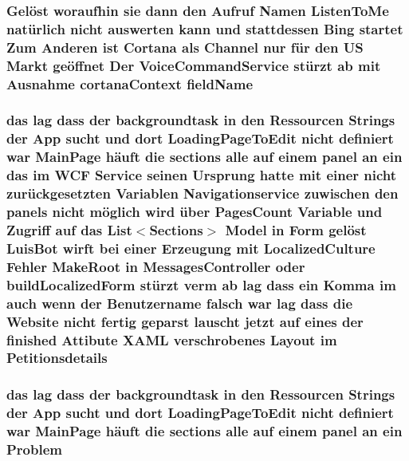 \subsubsection[{\texorpdfstring{field\+Name}{fieldName}}]{\setlength{\rightskip}{0pt plus 5cm}Gelöst woraufhin sie dann den Aufruf Namen Listen\+To\+Me natürlich nicht auswerten kann und stattdessen Bing startet Zum Anderen ist Cortana als Channel nur für den US Markt geöffnet Der Voice\+Command\+Service stürzt ab mit Ausnahme cortana\+Context field\+Name}\hypertarget{_r_e_a_d_m_e_8txt_a225ecf32ab26301c2eb46c45696e77a2}{}\label{_r_e_a_d_m_e_8txt_a225ecf32ab26301c2eb46c45696e77a2}
\subsubsection[{\texorpdfstring{Petitionsdetails}{Petitionsdetails}}]{\setlength{\rightskip}{0pt plus 5cm}das lag dass der backgroundtask in den Ressourcen Strings der App sucht und dort Loading\+Page\+To\+Edit nicht definiert {\bf war} Main\+Page häuft die sections alle auf einem panel an ein das im W\+CF Service seinen Ursprung hatte mit einer nicht zurückgesetzten Variablen Navigationservice zuwischen den panels nicht möglich wird über Pages\+Count Variable und Zugriff auf das List$<$Sections$>$ Model in Form gelöst Luis\+Bot wirft bei einer Erzeugung mit Localized\+Culture Fehler Make\+Root in Messages\+Controller oder build\+Localized\+Form stürzt verm ab lag dass ein Komma im auch wenn der Benutzername falsch {\bf war} lag dass die Website nicht fertig geparst lauscht jetzt auf eines der finished Attibute X\+A\+ML verschrobenes Layout im Petitionsdetails}\hypertarget{_r_e_a_d_m_e_8txt_ab1eb46320c0ab46284b341bc594406ed}{}\label{_r_e_a_d_m_e_8txt_ab1eb46320c0ab46284b341bc594406ed}
\subsubsection[{\texorpdfstring{Problem}{Problem}}]{\setlength{\rightskip}{0pt plus 5cm}das lag dass der backgroundtask in den Ressourcen Strings der App sucht und dort Loading\+Page\+To\+Edit nicht definiert {\bf war} Main\+Page häuft die sections alle auf einem panel an ein Problem}\hypertarget{_r_e_a_d_m_e_8txt_a86dd00a8c1f3448e32e23bece4a957d6}{}\label{_r_e_a_d_m_e_8txt_a86dd00a8c1f3448e32e23bece4a957d6}
